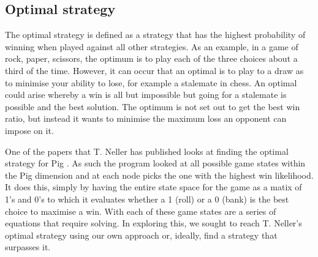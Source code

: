 \documentclass[a4paper,titlepage]{article}
\begin{document}
\subsection{Optimal strategy}

The optimal strategy is defined as a strategy that has the highest probability of winning when played against all other strategies. As an example, in a game of rock, paper, scissors, the optimum is to play each of the three choices about a third of the time. However, it can occur that an optimal is to play to a draw as to minimise your ability to lose, for example a stalemate in chess. An optimal could arise whereby a win is all but impossible but going for a stalemate is possible and the best solution. The optimum is not set out to get the best win ratio, but instead it wants to minimise the maximum loss an opponent can impose on it.

One of the papers that T. Neller has published looks at finding the optimal strategy for Pig \citep{neller2004optimal}. As such the program looked at all possible game states within the Pig dimension and at each node picks the one with the highest win likelihood. It does this, simply by having the entire state space for the game as a matix of 1's and 0's to which it evaluates whether a 1 (roll) or a 0 (bank) is the best choice to maximise a win. With each of these game states are a series of equations that require solving. In exploring this, we sought to reach T. Neller's optimal strategy using our own approach or, ideally, find a strategy that surpasses it.
\end{document}
